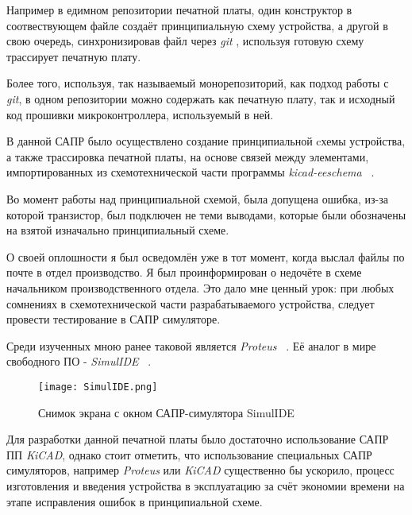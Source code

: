 Например в едимном репозитории печатной платы,
один конструктор в соотвествующем файле
создаёт принципиальную схему устройства,
а другой в свою очередь, синхронизировав файл
через \textit{git} , используя готовую схему
трассирует печатную плату.

Более того, используя, так называемый монорепозиторий, как подход работы с \textit{git},
в одном репозитории можно содержать как печатную плату,
так и исходный код прошивки микроконтроллера,
используемый в ней.

В данной САПР было осуществлено создание
принципиальной cхемы устройства,
а также трассировка печатной платы, на основе связей между элементами,
импортированных из схемотехнической
части программы \textit{kicad-eeschema} ~\cite{kicad-doc-eeschema}.


Во момент работы над принципиальной схемой, была
допущена ошибка, из-за которой транзистор,
был подключен не теми выводами,
которые были обозначены на взятой изначально принципиальный схеме.

О своей оплошности я был осведомлён уже в тот момент,
когда выслал файлы по почте в отдел производство.
Я был проинформирован о недочёте в схеме начальником производственного отдела.
Это дало мне ценный урок:
при любых сомнениях в схемотехнической части разрабатываемого устройства,
следует провести тестирование в САПР симуляторе.

Среди изученных мною ранее
таковой является \textit{Proteus} ~\cite{Proteus-Simulation}. Её аналог в мире свободного ПО - \textit{SimulIDE} ~\cite{SimulIDE}.
%

\begin{figure}[H]
  \centering
  \texttt{[image: SimulIDE.png]}
  \caption{Снимок экрана с окном САПР-симулятора SimulIDE}
\end{figure}

Для разработки данной печатной платы было достаточно
использование САПР ПП \textit{KiCAD},
однако стоит отметить, что использование специальных САПР симуляторов,
например \textit{Proteus} или \textit{KiCAD} существенно бы ускорило,
процесс изготовления и введения устройства в эксплуатацию
за счёт экономии времени на этапе исправления ошибок в принципиальной схеме.

\newpage


